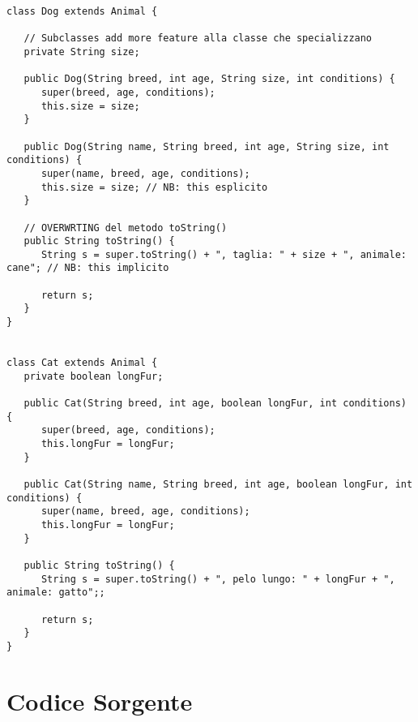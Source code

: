 \documentclass{article}
\begin{document}
	\begin{lstlisting}[caption={Estensione della classe Animale per definire nuove razze}]
		class Dog extends Animal {

   // Subclasses add more feature alla classe che specializzano
   private String size;

   public Dog(String breed, int age, String size, int conditions) {
      super(breed, age, conditions);
      this.size = size;
   }

   public Dog(String name, String breed, int age, String size, int conditions) {
      super(name, breed, age, conditions);
      this.size = size; // NB: this esplicito
   }

   // OVERWRTING del metodo toString()
   public String toString() {
      String s = super.toString() + ", taglia: " + size + ", animale: cane"; // NB: this implicito

      return s;
   }
}


class Cat extends Animal {
   private boolean longFur;

   public Cat(String breed, int age, boolean longFur, int conditions) {
      super(breed, age, conditions);
      this.longFur = longFur;
   }

   public Cat(String name, String breed, int age, boolean longFur, int conditions) {
      super(name, breed, age, conditions);
      this.longFur = longFur;
   }

   public String toString() {
      String s = super.toString() + ", pelo lungo: " + longFur + ", animale: gatto";;

      return s;
   }
}

	\end{lstlisting}
	
	
	\newpage
	
	\appendix
	\section{Codice Sorgente}
	
\end{document}
